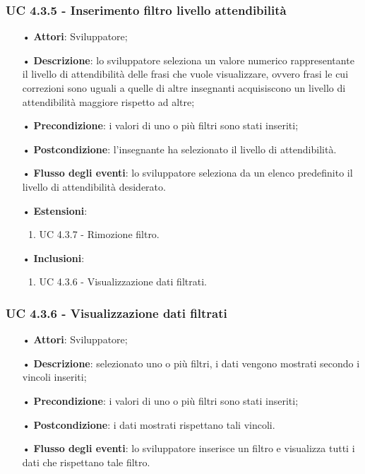 \subsubsection{UC 4.3.5 - Inserimento filtro livello attendibilità}
\begin{itemize}
	\item[•]\textbf{Attori}: Sviluppatore;
	\item[•]\textbf{Descrizione}: lo sviluppatore seleziona un valore numerico rappresentante il livello di attendibilità delle frasi che vuole visualizzare, ovvero frasi le cui correzioni sono uguali a quelle di altre insegnanti acquisiscono un livello di attendibilità maggiore rispetto ad altre;
	\item[•]\textbf{Precondizione}: i valori di uno o più filtri sono stati inseriti;
	\item[•]\textbf{Postcondizione}: l'insegnante ha selezionato il livello di attendibilità.
	\item[•]\textbf{Flusso degli eventi}: lo sviluppatore seleziona da un elenco predefinito il livello di attendibilità desiderato.
\item[•]\textbf{Estensioni}: 
	\begin{enumerate}
		\item UC 4.3.7 - Rimozione filtro.
	\end{enumerate}
	\item[•]\textbf{Inclusioni}:
	\begin{enumerate}
		\item UC 4.3.6 - Visualizzazione dati filtrati.
	\end{enumerate}
\end{itemize}

\subsubsection{UC 4.3.6 - Visualizzazione dati filtrati}
\begin{itemize}
	\item[•]\textbf{Attori}: Sviluppatore;
	\item[•]\textbf{Descrizione}: selezionato uno o più filtri, i dati vengono mostrati secondo i vincoli inseriti;
	\item[•]\textbf{Precondizione}: i valori di uno o più filtri sono stati inseriti;
	\item[•]\textbf{Postcondizione}: i dati mostrati rispettano tali vincoli.
	\item[•]\textbf{Flusso degli eventi}: lo sviluppatore inserisce un filtro e visualizza tutti i dati che rispettano tale filtro.
\end{itemize}

